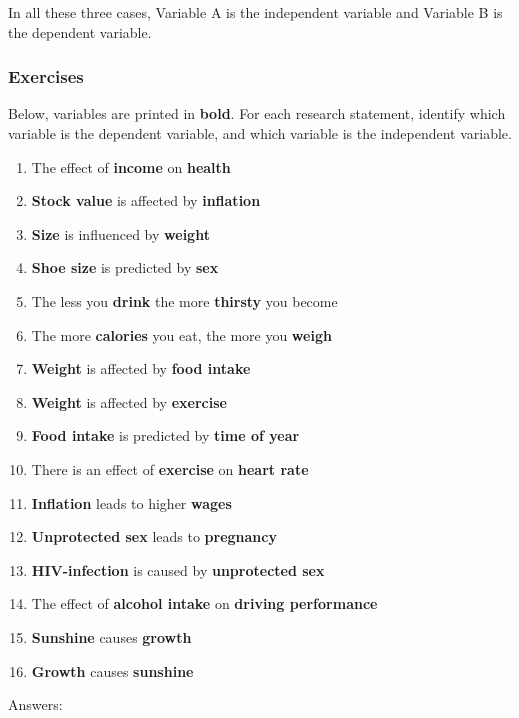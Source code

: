 \documentclass[]{report}\usepackage[]{graphicx}\usepackage[]{color}
\begin{document}
In all these three cases, Variable A is the independent variable and Variable B is the dependent variable.

\subsubsection{Exercises}

Below, variables are printed in \textbf{bold}. For each research statement, identify which variable is the dependent variable, and which variable is the independent variable.

\begin{enumerate}

\item The effect of \textbf{income} on \textbf{health}
\item \textbf{Stock value} is affected by \textbf{inflation}
\item \textbf{Size} is influenced by \textbf{weight}
\item \textbf{Shoe size} is predicted by \textbf{sex}
\item The less you \textbf{drink} the more \textbf{thirsty} you become 
\item The more \textbf{calories} you eat, the more you \textbf{weigh}
\item \textbf{Weight} is affected by \textbf{food intake} 
\item \textbf{Weight} is affected by \textbf{exercise} 
\item \textbf{Food intake} is predicted by \textbf{time of year}
\item There is an effect of \textbf{exercise} on \textbf{heart rate} 
\item \textbf{Inflation} leads to higher \textbf{wages} 
\item \textbf{Unprotected sex} leads to \textbf{pregnancy}
\item \textbf{HIV-infection} is caused by \textbf{unprotected sex}
\item The effect of \textbf{alcohol intake} on \textbf{driving performance}
\item \textbf{Sunshine} causes \textbf{growth}
\item \textbf{Growth} causes \textbf{sunshine}

\end{enumerate}

Answers:
\end{document}
